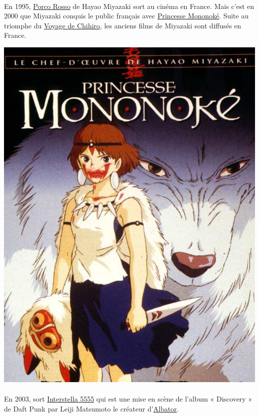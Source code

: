 \paragraph{} En 1995, \underline{Porco Rosso} de Hayao Miyazaki sort au cinéma
en France. Mais c’est en 2000 que Miyazaki conquis le public français avec
\underline{Princesse Mononoké}. Suite au triomphe du \underline{Voyage de
Chihiro}, les anciens films de Miyazaki sont diffusés en France. 

\begin{center}
	\includegraphics[scale=0.2]{miyazaki.jpg}
\end{center}

\paragraph{} En 2003, sort \underline{Interstella 5555} qui est une mise en
scène de l’album « Discovery » de Daft Punk par Leiji Matsumoto le créateur
d’\underline{Albator}.

